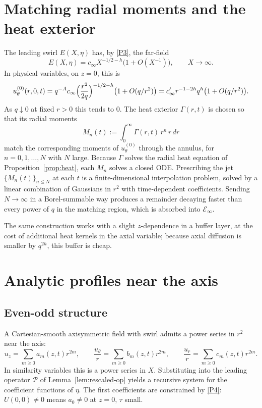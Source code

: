 \appendix
\section{Matching radial moments and the heat exterior}
\label{app:moments}

The leading swirl $E(X,\eta)$ has, by \ref{P3}, the far-field
\[
E(X,\eta)=c_\infty X^{-1/2-h}\bigl(1+O(X^{-1})\bigr),
\qquad X\to\infty.
\]
In physical variables, on $z=0$, this is
\[
u^{(0)}_\theta(r,0,t)
=q^{-A} c_\infty \Bigl(\frac{r^2}{2q}\Bigr)^{-1/2-h}\bigl(1+O(q/r^2)\bigr)
=c_\infty' r^{-1-2h} q^{h}\bigl(1+O(q/r^2)\bigr).
\]
As $q\downarrow 0$ at fixed $r>0$ this tends to $0$. The heat exterior $\Gamma(r,t)$ is chosen so that its radial moments
\[
M_n(t):=\int_0^\infty \Gamma(r,t)\, r^{n}\, r\,dr
\]
match the corresponding moments of $u^{(0)}_\theta$ through the annulus, for $n=0,1,\dots,N$ with $N$ large. Because $\Gamma$ solves the radial heat equation of Proposition~\ref{prop:heat}, each $M_n$ solves a closed ODE. Prescribing the jet $\{M_n(t)\}_{n\le N}$ at each $t$ is a finite-dimensional interpolation problem, solved by a linear combination of Gaussians in $r^2$ with time-dependent coefficients. Sending $N\to\infty$ in a Borel-summable way produces a remainder decaying faster than every power of $q$ in the matching region, which is absorbed into $\mathcal E_{\infty}$.

The same construction works with a slight $z$-dependence in a buffer layer, at the cost of additional heat kernels in the axial variable; because axial diffusion is smaller by $q^{2h}$, this buffer is cheap.

\section{Analytic profiles near the axis}
\label{app:axis}

\subsection{Even-odd structure}

A Cartesian-smooth axisymmetric field with swirl admits a power series in $r^2$ near the axis:
\[
u_z=\sum_{m\ge 0} a_m(z,t) r^{2m},
\qquad
\frac{u_\theta}{r}=\sum_{m\ge 0} b_m(z,t) r^{2m},
\qquad
\frac{u_r}{r}=\sum_{m\ge 0} c_m(z,t) r^{2m}.
\]
In similarity variables this is a power series in $X$. Substituting into the leading operator $\mathcal P$ of Lemma~\ref{lem:rescaled-op} yields a recursive system for the coefficient functions of $\eta$. The first coefficients are constrained by \ref{P4}: $U(0,0)\neq 0$ means $a_0\neq 0$ at $z=0$, $\tau$ small.

